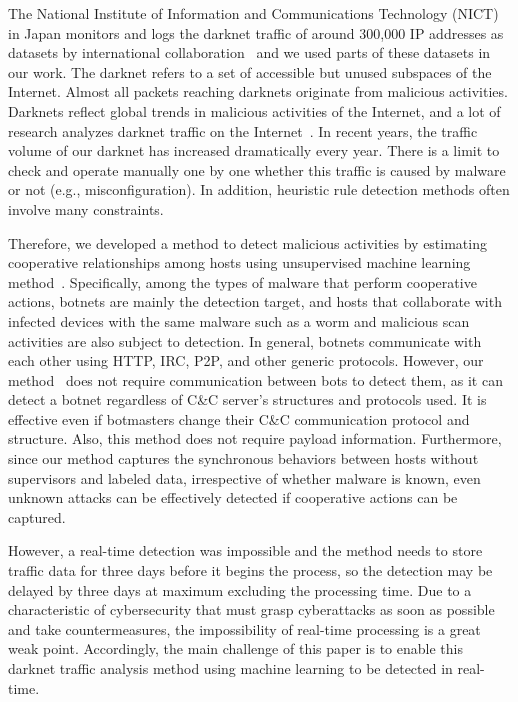 \documentclass[letterpaper]{sig-alternate-10pt}
\begin{document}
The National Institute of Information and Communications Technology (NICT) in Japan monitors and logs the darknet traffic of around 300,000 IP addresses as datasets by international collaboration~\cite{NICTERWEB} and we used parts of these datasets in our work.
The darknet refers to a set of accessible but unused subspaces of the Internet.
Almost all packets reaching darknets originate from malicious activities.
Darknets reflect global trends in malicious activities of the Internet, and a lot of research analyzes darknet traffic on the Internet~\cite{Ali, Bailey, Bailey2, Ban, Choi, Nakao}.
In recent years, the traffic volume of our darknet has increased dramatically every year.
There is a limit to check and operate manually one by one whether this traffic is caused by malware or not (e.g., misconfiguration).
In addition, heuristic rule detection methods often involve many constraints.

Therefore, we developed a method to detect malicious activities by estimating cooperative relationships among hosts using unsupervised machine learning method~\cite{Han}.
Specifically, among the types of malware that perform cooperative actions, botnets are mainly the detection target, and hosts that collaborate with infected devices with the same malware such as a worm and malicious scan activities are also subject to detection.
In general, botnets communicate with each other using HTTP, IRC, P2P, and other generic protocols.
However, our method~\cite{Han} does not require communication between bots to detect them, as it can detect a botnet regardless of C\&C server's structures and protocols used.
It is effective even if botmasters change their C\&C communication protocol and structure.
Also, this method does not require payload information.
Furthermore, since our method captures the synchronous behaviors between hosts without supervisors and labeled data, irrespective of whether malware is known, even unknown attacks can be effectively detected if cooperative actions can be captured.

However, a real-time detection was impossible and the method needs to store traffic data for three days before it begins the process, so the detection may be delayed by three days at maximum excluding the processing time.
Due to a characteristic of cybersecurity that must grasp cyberattacks as soon as possible and take countermeasures, the impossibility of real-time processing is a great weak point.
Accordingly, the main challenge of this paper is to enable this darknet traffic analysis method using machine learning to be detected in real-time.
\end{document}

